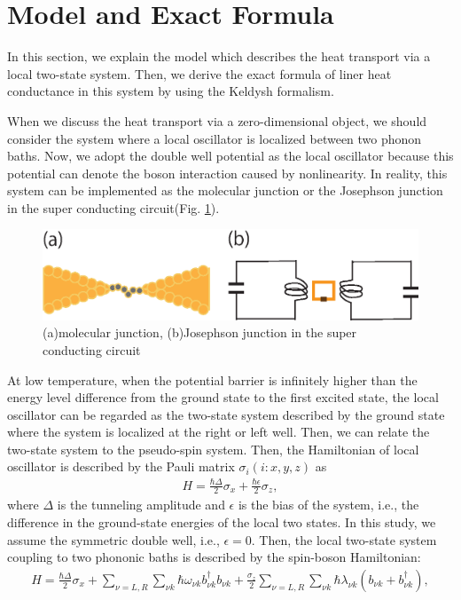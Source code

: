 \section{Model and Exact Formula}
In this section, we explain the model which describes the heat transport via a local two-state system.
Then, we derive the exact formula of liner heat conductance in this system by using the Keldysh formalism.

When we discuss the heat transport via a zero-dimensional object, we should consider the system where a local oscillator is localized between two phonon baths. 
Now, we adopt the double well potential as the local oscillator because this potential can denote the boson interaction caused by nonlinearity. In reality, this system can be implemented as the molecular junction or the Josephson junction in the super conducting circuit\cite{experiment?}(Fig. \ref{fig:j_c}).
\begin{figure}[tb]
	\centering
	\includegraphics[width=130mm]{j_c.eps}
	\caption{(a)molecular junction, (b)Josephson junction in the super conducting circuit}
	\label{fig:j_c}
\end{figure}
At low temperature, when the potential barrier is infinitely higher than the energy level difference from the ground state to the first excited state, the local oscillator can be regarded as the two-state system described by the ground state where the system is localized at the right or left well.
Then, we can relate the two-state system to the pseudo-spin system. 
Then, the Hamiltonian of local oscillator is described by  the Pauli matrix $\sigma_{i}(i:x,y,z)$ as
\begin{eqnarray}
	H=\frac{\hbar \Delta}{2} \sigma_x+\frac{\hbar\epsilon}{2}\sigma_z,
\end{eqnarray}
where $\Delta$ is the tunneling amplitude and $\epsilon$ is the bias of the system, i.e., the difference in the ground-state energies of the local two states.
In this study, we assume the symmetric double well, i.e., $\epsilon=0$.
Then, the local two-state system coupling to two phononic baths is described by the spin-boson Hamiltonian:
\begin{eqnarray}
	H=\frac{\hbar \Delta}{2} \sigma_x 
	+\sum_{\nu=L,R}\sum_{\nu k}\hbar \omega_{\nu k } b_{\nu k}^{\dagger} b_{\nu k}
	+ \frac{\sigma_z}{2} \sum_{\nu=L,R}\sum_{\nu k} \hbar \lambda_{\nu k}(b_{\nu k}+b_{\nu k}^{\dagger}),
	\label{Hamiltonian}
\end{eqnarray}
